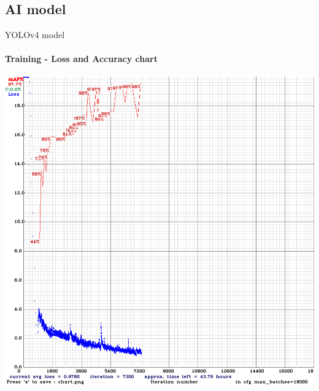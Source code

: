 \documentclass{beamer}
\begin{document}
	\subsection{AI model}
	\begin{frame}{YOLOv4 model}
		\framesubtitle{Training - Loss and Accuracy chart}
		\begin{center}
			\includegraphics[height=0.7\textheight]{res/darknet_training_chart}
		\end{center}
	\end{frame}
\end{document}
